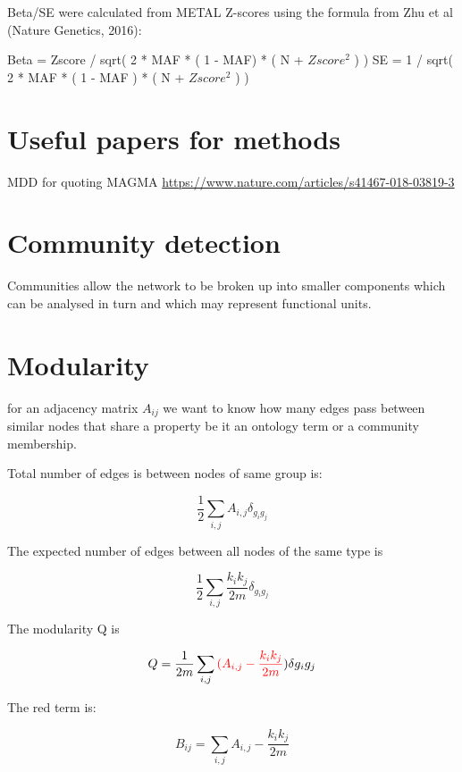Beta/SE were calculated from METAL Z-scores using the formula from Zhu et al (Nature Genetics, 2016):

Beta = Zscore / sqrt( 2 * MAF * ( 1 - MAF) * ( N + $Zscore^2$ ) )
SE = 1 / sqrt( 2 * MAF * ( 1 - MAF ) * ( N + $Zscore^2$ ) )

\section{Useful papers for methods}

MDD for quoting MAGMA \url{https://www.nature.com/articles/s41467-018-03819-3}

\section{Community detection}

Communities allow the network to be broken up into smaller components which can be analysed in turn and which may represent functional units.


\section{Modularity}

for an adjacency matrix $A_{ij}$ we want to know how many edges pass between similar nodes that share a property be it an ontology term or a community membership.

Total number of edges is between nodes of same group is:

\begin{equation}
\label{eq:notes_modularity_totaledges}
    \frac{1}{2} \sum_{i,j} A_{i,j}\delta_{g_i g_j}
\end{equation}

The expected number of edges between all nodes of the same type is 

\begin{equation}
    \frac{1}{2}\sum_{i,j} \frac{k_i k_j}{2m}\delta_{g_i g_j}
\end{equation}

The modularity Q is 

\begin{equation}
    Q=\frac{1}{2m}\sum_{i,j}\textcolor{red}{(A_{i,j}-\frac{k_i k_j}{2m}}) \delta{g_i g_j}
\end{equation}

The red term is:

\begin{equation}
    B_{ij} = \sum_{i,j} A_{i,j} - \frac{k_i k_j}{2m}
\end{equation}

